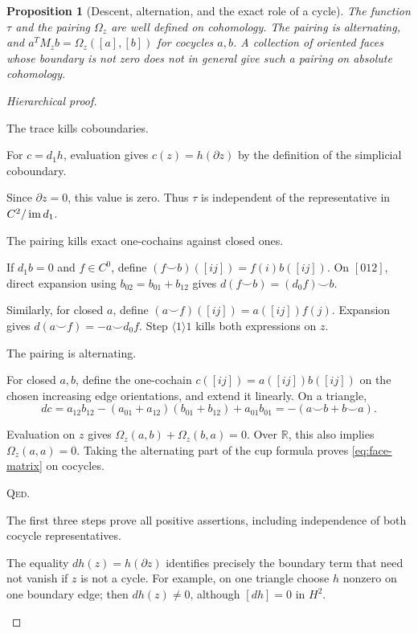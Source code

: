 \documentclass[11pt,a4paper]{article}
\newtheorem{proposition}[definition]{Proposition}
\theoremstyle{remark}\newtheorem{remark}[definition]{Remark}
\newcommand{\R}{\mathbb R}\newcommand{\C}{\mathbb C}\newcommand{\Z}{\mathbb Z}
\newcommand{\QED}{\textsc{Qed}}
\begin{document}
\begin{proposition}[Descent, alternation, and the exact role of a cycle]\label{prop:descent}
The function $\tau$ and the pairing $\Omega_z$ are well defined on cohomology. The pairing is alternating, and $a^TM_zb=\Omega_z([a],[b])$ for cocycles $a,b$. A collection of oriented faces whose boundary is not zero does not in general give such a pairing on absolute cohomology.
\end{proposition}
\begin{proof}[Hierarchical proof]
\begin{steps}
\item The trace kills coboundaries.
\begin{steps}
\item For $c=d_1h$, evaluation gives $c(z)=h(\partial z)$ by the definition of the simplicial coboundary.
\item Since $\partial z=0$, this value is zero. Thus $\tau$ is independent of the representative in $C^2/\operatorname{im} d_1$.
\end{steps}
\item The pairing kills exact one-cochains against closed ones.
\begin{steps}
\item If $d_1b=0$ and $f\in C^0$, define $(f\smile b)([ij])=f(i)b([ij])$. On $[012]$, direct expansion using $b_{02}=b_{01}+b_{12}$ gives $d(f\smile b)=(d_0f)\smile b$.
\item Similarly, for closed $a$, define $(a\smile f)([ij])=a([ij])f(j)$. Expansion gives $d(a\smile f)=-a\smile d_0f$. Step $\langle1\rangle1$ kills both expressions on $z$.
\end{steps}
\item The pairing is alternating.
\begin{steps}
\item For closed $a,b$, define the one-cochain $c([ij])=a([ij])b([ij])$ on the chosen increasing edge orientations, and extend it linearly. On a triangle,
\[
dc=a_{12}b_{12}-(a_{01}+a_{12})(b_{01}+b_{12})+a_{01}b_{01}
=-(a\smile b+b\smile a).
\]
\item Evaluation on $z$ gives $\Omega_z(a,b)+\Omega_z(b,a)=0$. Over $\R$, this also implies $\Omega_z(a,a)=0$. Taking the alternating part of the cup formula proves \eqref{eq:face-matrix} on cocycles.
\end{steps}
\item \QED.
\begin{steps}
\item The first three steps prove all positive assertions, including independence of both cocycle representatives.
\item The equality $dh(z)=h(\partial z)$ identifies precisely the boundary term that need not vanish if $z$ is not a cycle. For example, on one triangle choose $h$ nonzero on one boundary edge; then $dh(z)\ne0$, although $[dh]=0$ in $H^2$.
\end{steps}
\end{steps}
\end{proof}
\end{document}
